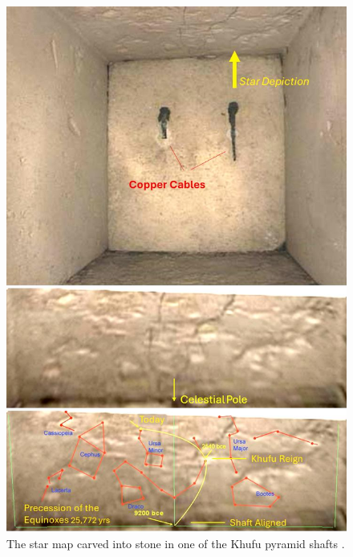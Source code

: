 \documentclass[10pt,twocolumn,letterpaper]{article}
\begin{document}
\begin{figure}[H]
\begin{center}
   \includegraphics[width=1\linewidth]{star-stone.jpg}
\end{center}
   \caption{The star map carved into stone in one of the Khufu pyramid shafts \cite{28}.}
\label{fig:20}
\label{fig:onecol}
\end{figure}

\end{document}
